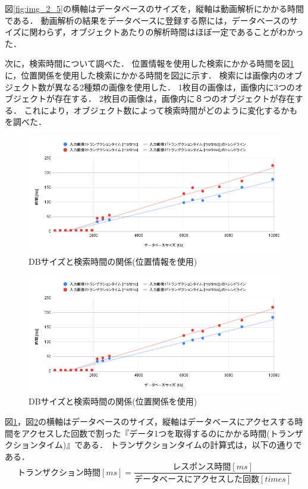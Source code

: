\documentclass[a4j,12pt,dvipdfmx]{jreport}
\begin{document}
図\ref{fig:img_2_5}の横軸はデータベースのサイズを，縦軸は動画解析にかかる時間である．
動画解析の結果をデータベースに登録する際には，データベースのサイズに関わらず，オブジェクトあたりの解析時間はほぼ一定であることがわかった．

次に，検索時間について調べた．
位置情報を使用した検索にかかる時間を図\ref{fig:img_2_5_2}に，位置関係を使用した検索にかかる時間を図\ref{fig:img_2_5_3}に示す．
検索には画像内のオブジェクト数が異なる2種類の画像を使用した．
1枚目の画像は，画像内に3つのオブジェクトが存在する．
2枚目の画像は，画像内に８つのオブジェクトが存在する．
これにより，オブジェクト数によって検索時間がどのように変化するかもを調べた．
\begin{figure}[H]
  \centering
  \includegraphics[width=13cm]{image/result_2_5_2.png}
  \caption{DBサイズと検索時間の関係(位置情報を使用)}
  \label{fig:img_2_5_2}
\end{figure}

\begin{figure}[H]
  \centering
  \includegraphics[width=13cm]{image/result_2_5_3.png}
  \caption{DBサイズと検索時間の関係(位置関係を使用)}
  \label{fig:img_2_5_3}
\end{figure}

図\ref{fig:img_2_5_2}，図\ref{fig:img_2_5_3}の横軸はデータベースのサイズ，縦軸はデータベースにアクセスする時間をアクセスした回数で割った『データ1つを取得するのにかかる時間(トランザクションタイム)』である．
トランザクションタイムの計算式は，以下の通りである．
\begin{equation}
  トランザクション時間[ms] = \frac{レスポンス時間[ms]}{データベースにアクセスした回数[times]}
\end{equation}
\end{document}
